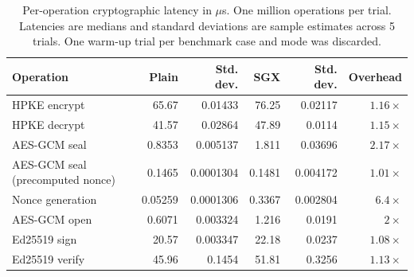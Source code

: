 \begin{table}
\centering
\small
\setlength{\tabcolsep}{4pt}
\begin{tabular}{lrrrrr}
\toprule
Operation & Plain & Std. dev. & SGX & Std. dev. & Overhead \\
\midrule
HPKE encrypt & 65.67 & 0.01433 & 76.25 & 0.02117 & $1.16\times$ \\
HPKE decrypt & 41.57 & 0.02864 & 47.89 & 0.0114 & $1.15\times$ \\
AES-GCM seal & 0.8353 & 0.005137 & 1.811 & 0.03696 & $2.17\times$ \\
\quad AES-GCM seal (precomputed nonce) & 0.1465 & 0.0001304 & 0.1481 & 0.004172 & $1.01\times$ \\
\quad Nonce generation & 0.05259 & 0.0001306 & 0.3367 & 0.002804 & $6.4\times$ \\
AES-GCM open & 0.6071 & 0.003324 & 1.216 & 0.0191 & $2\times$ \\
Ed25519 sign & 20.57 & 0.003347 & 22.18 & 0.0237 & $1.08\times$ \\
Ed25519 verify & 45.96 & 0.1454 & 51.81 & 0.3256 & $1.13\times$ \\
\bottomrule
\end{tabular}
\caption{Per-operation cryptographic latency in ${}\mu$s. One million operations per trial. Latencies are medians and standard deviations are sample estimates across 5 trials. One warm-up trial per benchmark case and mode was discarded.}
\label{tab:reproduction-table4-1m}
\end{table}
